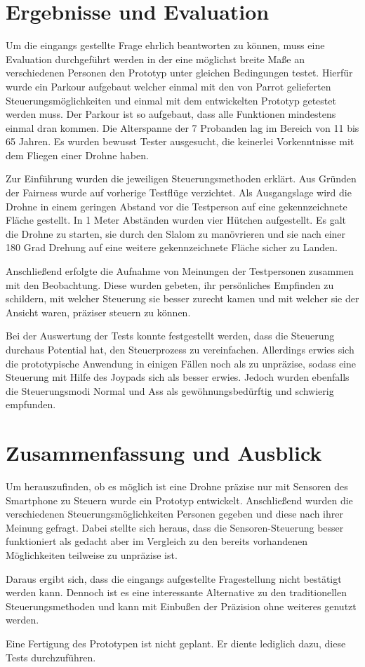 \documentclass{article}
\begin{document}
\section{Ergebnisse und Evaluation}
Um die eingangs gestellte Frage ehrlich beantworten zu können, muss eine Evaluation durchgeführt werden in der eine möglichst breite Maße an verschiedenen Personen den Prototyp unter gleichen Bedingungen testet. Hierfür wurde ein Parkour aufgebaut welcher einmal mit den von Parrot gelieferten Steuerungsmöglichkeiten und einmal mit dem entwickelten Prototyp getestet werden muss. Der Parkour ist so aufgebaut, dass alle Funktionen mindestens einmal dran kommen. Die Alterspanne der 7 Probanden lag im Bereich von 11 bis 65 Jahren. Es wurden bewusst Tester ausgesucht, die keinerlei Vorkenntnisse mit dem Fliegen einer Drohne haben.

Zur Einführung wurden die jeweiligen Steuerungsmethoden erklärt. Aus Gründen der Fairness wurde auf vorherige Testflüge verzichtet. Als Ausgangslage wird die Drohne in einem geringen Abstand vor die Testperson auf eine gekennzeichnete Fläche gestellt. In 1 Meter Abständen wurden vier Hütchen aufgestellt. Es galt die Drohne zu starten, sie durch den Slalom zu manövrieren und sie nach einer 180 Grad Drehung auf eine weitere gekennzeichnete Fläche sicher zu Landen.

Anschließend erfolgte die Aufnahme von Meinungen der Testpersonen zusammen mit den Beobachtung. Diese wurden gebeten, ihr persönliches Empfinden zu schildern, mit welcher Steuerung sie besser zurecht kamen und mit welcher sie der Ansicht waren, präziser steuern zu können.

Bei der Auswertung der Tests konnte festgestellt werden, dass die Steuerung durchaus Potential hat, den Steuerprozess zu vereinfachen. Allerdings erwies sich die prototypische Anwendung in einigen Fällen noch als zu unpräzise, sodass eine Steuerung mit Hilfe des Joypads sich als besser erwies. Jedoch wurden ebenfalls die Steuerungsmodi Normal und Ass als gewöhnungsbedürftig und schwierig empfunden.

\section{Zusammenfassung und Ausblick}
Um herauszufinden, ob es möglich ist eine Drohne präzise nur mit Sensoren des Smartphone zu Steuern wurde ein Prototyp entwickelt. Anschließend wurden die verschiedenen Steuerungsmöglichkeiten Personen gegeben und diese nach ihrer Meinung gefragt. Dabei stellte sich heraus, dass die Sensoren-Steuerung besser funktioniert als gedacht aber im Vergleich zu den bereits vorhandenen Möglichkeiten teilweise zu unpräzise ist. 

Daraus ergibt sich, dass die eingangs aufgestellte Fragestellung nicht bestätigt werden kann. Dennoch ist es eine interessante Alternative zu den traditionellen Steuerungsmethoden und kann mit Einbußen der Präzision ohne weiteres genutzt werden.

Eine Fertigung des Prototypen ist nicht geplant. Er diente lediglich dazu, diese Tests durchzuführen.

{}

\end{document}
